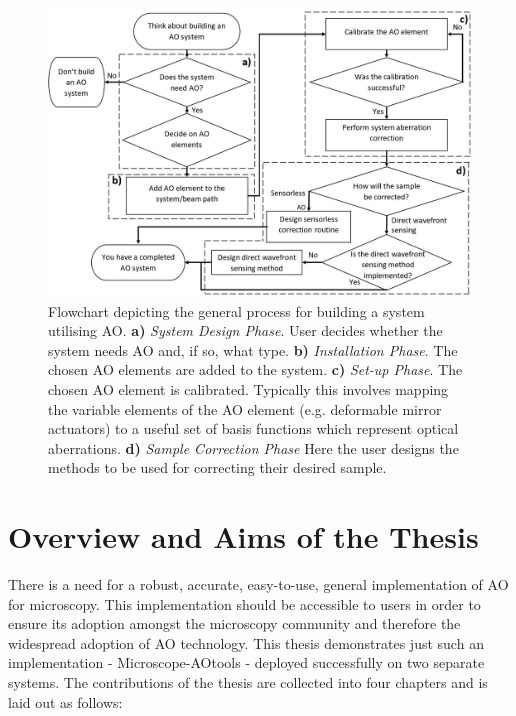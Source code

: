 \begin{figure}[h]
	\centering
	\includegraphics[width=1\textwidth, scale=0.5]{./images/ao_system_setup_workflow_new.jpg}
	\caption{Flowchart depicting the general process for building a system utilising AO. \textbf{a)} \textit{System Design Phase}. User decides whether the system needs AO and, if so, what type. \textbf{b)} \textit{Installation Phase}. The chosen AO elements are added to the system. \textbf{c)} \textit{Set-up Phase}. The chosen AO element is calibrated. Typically this involves mapping the variable elements of the AO element (e.g. deformable mirror actuators) to a useful set of basis functions which represent optical aberrations. \textbf{d)} \textit{Sample Correction Phase} Here the user designs the methods to be used for correcting their desired sample.}
	\label{fig:ao_system_setup_workflow}
\end{figure}

\section{Overview and Aims of the Thesis}
\label{sec:overview}

There is a need for a robust, accurate, easy-to-use, general implementation 
of AO for microscopy\cite{ji2017adaptive,rodriguez2018adaptive}.
This implementation should be accessible to users in order to ensure its
adoption amongst the microscopy community and therefore the widespread 
adoption of AO technology. This thesis demonstrates just such an 
implementation - Microscope-AOtools - deployed successfully on two separate 
systems. The contributions of the thesis are collected into four chapters 
and is laid out as follows:


